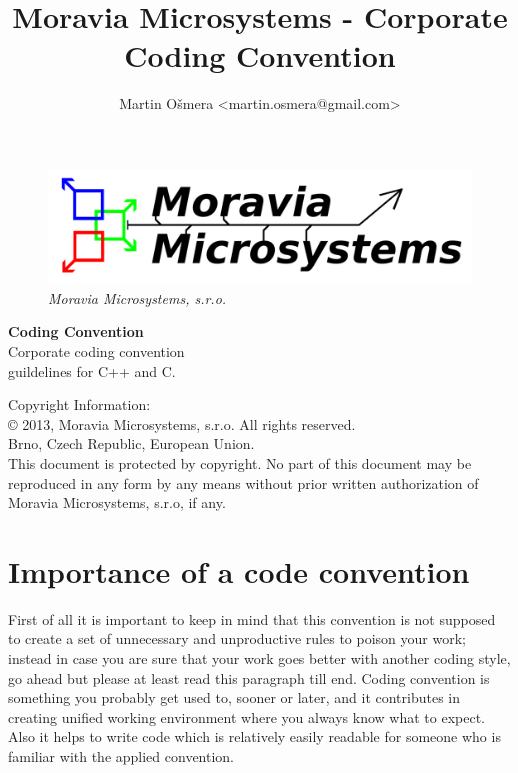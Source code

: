\documentclass[a4paper,twoside,15pt]{book}
\title{Moravia Microsystems - Corporate Coding Convention}
\author{Martin Ošmera <martin.osmera@gmail.com>}
\begin{document}
\begin{titlepage}
        \begin{figure}[ht!]
                \centering{}
                \includegraphics[width=.9\textwidth]{Moravia_Microsystems.png}
                \caption{\textit{Moravia Microsystems, s.r.o.}}
        \end{figure}
        \begin{center}
                \fontsize{35.83pt}{60pt} \selectfont{}
                \textbf{Coding Convention}
                \\[2cm]
                \fontsize{25pt}{30pt} \selectfont{}
                Corporate coding convention\\
                guildelines for C++ and C.
        \end{center}
\end{titlepage}

Copyright Information:
\\
\copyright{} 2013, Moravia Microsystems, s.r.o. All rights reserved.\\
Brno, Czech Republic, European Union.
\\
This document is protected by copyright. No part of this document may be reproduced in any form by any means
without prior written authorization of Moravia Microsystems, s.r.o, if any.

\tableofcontents

\chapter{Importance of a code convention}
    First of all it is important to keep in mind that this convention is not supposed to create a set of unnecessary and unproductive rules to poison your work; instead in case you are sure that your work goes better with another coding style, go ahead but please at least read this paragraph till end. Coding convention is something you probably get used to, sooner or later, and it contributes in creating unified working environment where you always know what to expect. Also it helps to write code which is relatively easily readable for someone who is familiar with the applied convention.
\end{document}
